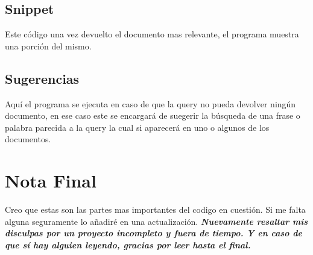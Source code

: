 \documentclass[100t]{article}
\begin{document}
\subsection{Snippet}
Este código una vez devuelto el documento mas relevante, el programa muestra una porción del mismo.
\subsection{Sugerencias}
Aquí el programa se ejecuta en caso de que la query no pueda devolver ningún documento, en ese caso este se encargará de suegerir la búsqueda  de una frase o palabra parecida a la query la cual si aparecerá en uno o algunos de los documentos. 
\section{Nota Final}
Creo que estas son las partes mas importantes del codigo en cuestión. Si me falta alguna seguramente lo añadiré en una actualización. 
\linebreak
{\LARGE \textbf{\textit{Nuevamente resaltar mis disculpas por un proyecto incompleto y fuera de tiempo. Y en caso de que sí hay alguien leyendo, gracias por leer hasta el final.}}}
\end{document}
